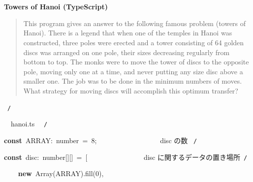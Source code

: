 \documentclass[a4paper,10pt]{article}
\def\mc{\relax}
\begin{document}
\tt\mc 

\noindent
\mbox{}\rm\mc {\tt /}{\tt *}\  \hrulefill *
\tt\mc 

\noindent
\mbox{}\hfill

\noindent
\mbox{}\rm\mc \ %

\centerline{\bf Towers of Hanoi (TypeScript)}

\begin{quote}

This program gives an answer to the following famous problem (towers of
Hanoi).
There is a legend that when one of the temples in Hanoi was constructed,
three poles were erected and a tower consisting of 64 golden discs was
arranged on one pole, their sizes decreasing regularly from bottom to top.
The monks were to move the tower of discs to the opposite pole, moving
only one at a time, and never putting any size disc above a smaller one.
The job was to be done in the minimum numbers of moves. What strategy for
moving discs will accomplish this optimum transfer?
\end{quote}

\tt\mc 

\noindent
\mbox{}\hfill

\noindent
\mbox{}\rm\mc {\tt *} \hrulefill \rm\mc \ {\tt *}{\tt /}
\tt\mc 

\noindent
\mbox{}\hfill

\noindent
\mbox{}\rm\mc {\tt /}{\tt *}\  \hrulefill\ hanoi.ts \ \hrulefill \rm\mc \ {\tt *}{\tt /}
\tt\mc 

\noindent
\mbox{}\hfill

\noindent
\mbox{}\textbf{const}{\tt\mc \ }ARRAY:{\tt\mc \ }number{\tt\mc \ }={\tt\mc \ }8;{\tt\mc \ }{\tt\mc \ }{\tt\mc \ }{\tt\mc \ }{\tt\mc \ }{\tt\mc \ }{\tt\mc \ }{\tt\mc \ }{\tt\mc \ }{\tt\mc \ }{\tt\mc \ }{\tt\mc \ }{\tt\mc \ }{\tt\mc \ }{\tt\mc \ }{\tt\mc \ }\rm\mc {\tt /}{\tt *}\  \ disc の数 \hfill \rm\mc \ {\tt *}{\tt /}
\tt\mc 

\noindent
\mbox{}\hfill

\noindent
\mbox{}\textbf{const}{\tt\mc \ }disc:{\tt\mc \ }number[][]{\tt\mc \ }={\tt\mc \ }[{\tt\mc \ }{\tt\mc \ }{\tt\mc \ }{\tt\mc \ }{\tt\mc \ }{\tt\mc \ }{\tt\mc \ }{\tt\mc \ }{\tt\mc \ }{\tt\mc \ }{\tt\mc \ }{\tt\mc \ }{\tt\mc \ }{\tt\mc \ }\rm\mc {\tt /}{\tt *}\  \ disc に関するデータの置き場所\hfill \rm\mc \ {\tt *}{\tt /}
\tt\mc 

\noindent
\mbox{}{\tt\mc \ }{\tt\mc \ }{\tt\mc \ }{\tt\mc \ }\textbf{new}{\tt\mc \ }Array(ARRAY).fill(0),
\end{document}
